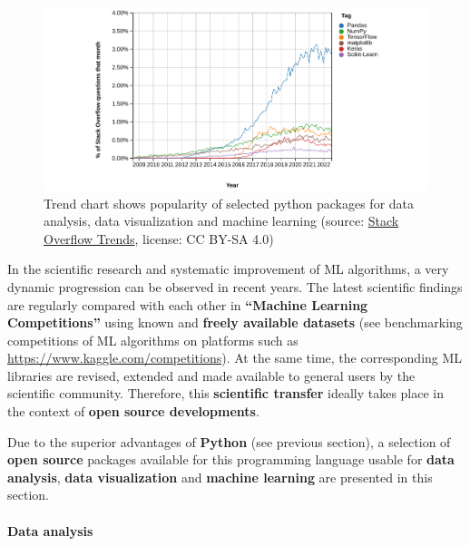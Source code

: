 \documentclass [oneside,10pt,a4paper,ngerman,BCOR10mm,headsepline,parindent,final]{scrartcl}
\begin{document}
\begin{figure}
\centering
\includegraphics{images/2022-09-07_StackOverflowTrends_MLPythonPackages_wide.png}
\caption{Trend chart shows popularity of selected python packages for
data analysis, data visualization and machine learning (source:
\href{https://insights.stackoverflow.com/trends?tags=pandas\%2Ctensorflow\%2Cnumpy\%2Ckeras\%2Cscikit-learn\%2Cmatplotlib}{Stack
Overflow Trends}, license: CC BY-SA 4.0)}
\end{figure}

In the scientific research and systematic improvement of ML algorithms,
a very dynamic progression can be observed in recent years. The latest
scientific findings are regularly compared with each other in
\textbf{``Machine Learning Competitions''} using known and
\textbf{freely available datasets} (see benchmarking competitions of ML
algorithms on platforms such as
\url{https://www.kaggle.com/competitions}). At the same time, the
corresponding ML libraries are revised, extended and made available to
general users by the scientific community. Therefore, this
\textbf{scientific transfer} ideally takes place in the context of
\textbf{open source developments}.

Due to the superior advantages of \textbf{Python} (see previous
section), a selection of \textbf{open source} packages available for
this programming language usable for \textbf{data analysis},
\textbf{data visualization} and \textbf{machine learning} are presented
in this section.

    \hypertarget{data-analysis}{%
\paragraph{Data analysis}\label{data-analysis}}
\end{document}
